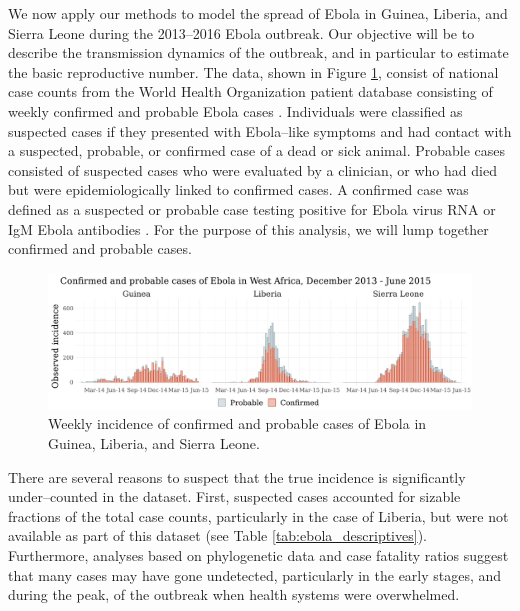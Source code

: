 We now apply our methods to model the spread of Ebola in Guinea, Liberia, and Sierra Leone during the 2013--2016 Ebola outbreak. Our objective will be to describe the transmission dynamics of the outbreak, and in particular to estimate the basic reproductive number. The data, shown in Figure \ref{fig:eboladat}, consist of national case counts from the World Health Organization patient database consisting of weekly confirmed and probable Ebola cases \cite{who2016eboladat}. Individuals were classified as suspected cases if they presented with Ebola--like symptoms and had contact with a suspected, probable, or confirmed case of a dead or sick animal. Probable cases consisted of suspected cases who were evaluated by a clinician, or who had died but were epidemiologically linked to confirmed cases. A confirmed case was defined as a suspected or probable case testing positive for Ebola virus RNA or IgM Ebola antibodies \cite{coltart2017ebola}. For the purpose of this analysis, we will lump together confirmed and probable cases.

\begin{figure}[htbp]
	\centering
	\includegraphics[width=\linewidth]{figures/ebola_dat}
	\caption{Weekly incidence of confirmed and probable cases of Ebola in Guinea, Liberia, and Sierra Leone.}
	\label{fig:eboladat}
\end{figure}

There are several reasons to suspect that the true incidence is significantly under--counted in the dataset. First, suspected cases accounted for sizable fractions of the total case counts, particularly in the case of Liberia, but were not available as part of this dataset (see Table \ref{tab:ebola_descriptives}). Furthermore, analyses based on phylogenetic data \cite{scarpino2014epidemiological} and case fatality ratios \cite{atkins2015under,garske2017heterogeneities} suggest that many cases may have gone undetected, particularly in the early stages, and during the peak, of the outbreak when health systems were overwhelmed. 

